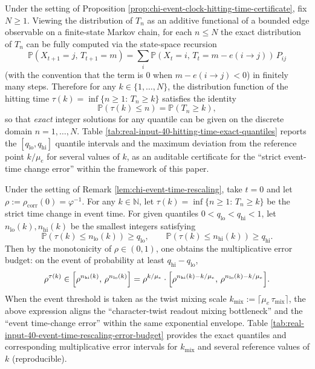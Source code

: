 

\begin{remark}
\label{prop:chi-event-clock-hitting-time-exact-quantiles}
Under the setting of Proposition \ref{prop:chi-event-clock-hitting-time-certificate}, fix $N\ge 1$.
Viewing the distribution of $T_n$ as an additive functional of a bounded edge observable on a finite-state Markov chain, for each $n\le N$ the exact distribution of $T_n$ can be fully computed via the state-space recursion
$$
\mathbb{P}(X_{t+1}=j,\,T_{t+1}=m) = \sum_i \mathbb{P}(X_t=i,\,T_t=m-e(i\to j))\,P_{ij}
$$
(with the convention that the term is $0$ when $m-e(i\to j)<0$) in finitely many steps.
Therefore for any $k\in\{1,\dots,N\}$, the distribution function of the hitting time $\tau(k)=\inf\{n\ge 1:\,T_n\ge k\}$ satisfies the identity
$$
\mathbb{P}(\tau(k)\le n)=\mathbb{P}(T_n\ge k),
$$
so that \emph{exact} integer solutions for any quantile can be given on the discrete domain $n=1,\dots,N$.
Table \ref{tab:real-input-40-hitting-time-exact-quantiles} reports the $[q_{\mathrm{lo}},q_{\mathrm{hi}}]$ quantile intervals and the maximum deviation from the reference point $k/\mu_e$ for several values of $k$, as an auditable certificate for the ``strict event-time change error'' within the framework of this paper.
\end{remark}



\begin{remark}
\label{cor:chi-event-time-exponential-envelope-error-budget}
Under the setting of Remark \ref{lem:chi-event-time-rescaling}, take $t=0$ and let $\rho:=\rho_{\mathrm{corr}}(0)=\varphi^{-1}$.
For any $k\in\mathbb{N}$, let $\tau(k)=\inf\{n\ge 1:\,T_n\ge k\}$ be the strict time change in event time.
For given quantiles $0<q_{\mathrm{lo}}<q_{\mathrm{hi}}<1$, let $n_{\mathrm{lo}}(k),n_{\mathrm{hi}}(k)$ be the smallest integers satisfying
$$
\mathbb{P}(\tau(k)\le n_{\mathrm{lo}}(k))\ge q_{\mathrm{lo}},
\qquad
\mathbb{P}(\tau(k)\le n_{\mathrm{hi}}(k))\ge q_{\mathrm{hi}}.
$$
Then by the monotonicity of $\rho\in(0,1)$, one obtains the multiplicative error budget: on the event of probability at least $q_{\mathrm{hi}}-q_{\mathrm{lo}}$,
$$
\rho^{\tau(k)}\in\Bigl[\rho^{n_{\mathrm{hi}}(k)},\,\rho^{n_{\mathrm{lo}}(k)}\Bigr]
=\rho^{k/\mu_e}\cdot\Bigl[\rho^{n_{\mathrm{hi}}(k)-k/\mu_e},\,\rho^{n_{\mathrm{lo}}(k)-k/\mu_e}\Bigr].
$$
When the event threshold is taken as the twist mixing scale $k_{\mathrm{mix}}:=\lceil\mu_e\,\tau_{\mathrm{mix}}\rceil$, the above expression aligns the ``character-twist readout mixing bottleneck'' and the ``event time-change error'' within the same exponential envelope.
Table \ref{tab:real-input-40-event-time-rescaling-error-budget} provides the exact quantiles and corresponding multiplicative error intervals for $k_{\mathrm{mix}}$ and several reference values of $k$ (reproducible).
\end{remark}

